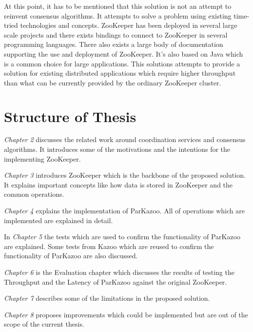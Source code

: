 At this point, it has to be mentioned that this solution is not an attempt to reinvent consensus algorithms. It attempts to solve a problem using existing time-tried technologies and concepts. ZooKeeper has been deployed in several large scale projects and there exists bindings to connect to ZooKeeper in several programming languages. There also exists a large body of documentation supporting the use and deployment of ZooKeeper. It's also based on Java which is a common choice for large applications. This solutions attempts to provide a solution for existing distributed applications which require higher throughput than what can be currently provided by the ordinary ZooKeeper cluster.

\section{Structure of Thesis}

\textit{Chapter 2} discusses the related work around coordination services and consensus algorithms. It introduces some of the motivations and the intentions for the implementing ZooKeeper.

\textit{Chapter 3} introduces ZooKeeper which is the backbone of the proposed solution. It explains important concepts like how data is stored in ZooKeeper and the common operations.

\textit{Chapter 4} explains the implementation of ParKazoo. All of operations which are implemented are explained in detail.

In \textit{Chapter 5} the tests which are used to confirm the functionality of ParKazoo are explained. Some tests from Kazoo which are reused to confirm the functionality of ParKazoo are also discussed.

\textit{Chapter 6} is the Evaluation chapter which discusses the results of testing the Throughput and the Latency of ParKazoo against the original ZooKeeper.

\textit{Chapter 7} describes some of the limitations in the proposed solution.

\textit{Chapter 8} proposes improvements which could be implemented but are out of the scope of the current thesis.
